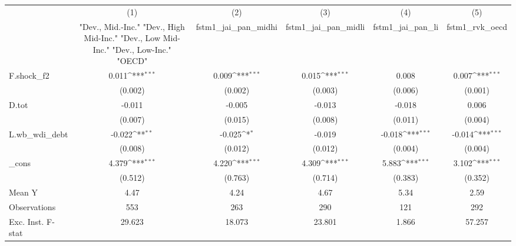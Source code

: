 {
\def\sym#1{\ifmmode^{#1}\else\(^{#1}\)\fi}
\begin{tabular}{l*{5}{c}}
\toprule
            &\multicolumn{1}{c}{(1)}&\multicolumn{1}{c}{(2)}&\multicolumn{1}{c}{(3)}&\multicolumn{1}{c}{(4)}&\multicolumn{1}{c}{(5)}\\
            &\multicolumn{1}{c}{ "Dev., Mid.-Inc." "Dev., High Mid-Inc." "Dev., Low Mid-Inc." "Dev., Low-Inc." "OECD" }&\multicolumn{1}{c}{fstm1\_jai\_pan\_midhi}&\multicolumn{1}{c}{fstm1\_jai\_pan\_midli}&\multicolumn{1}{c}{fstm1\_jai\_pan\_li}&\multicolumn{1}{c}{fstm1\_rvk\_oecd}\\
\midrule
F.shock\_f2  &       0.011\sym{***}&       0.009\sym{***}&       0.015\sym{***}&       0.008         &       0.007\sym{***}\\
            &     (0.002)         &     (0.002)         &     (0.003)         &     (0.006)         &     (0.001)         \\
\addlinespace
D.tot       &      -0.011         &      -0.005         &      -0.013         &      -0.018         &       0.006         \\
            &     (0.007)         &     (0.015)         &     (0.008)         &     (0.011)         &     (0.004)         \\
\addlinespace
L.wb\_wdi\_debt&      -0.022\sym{**} &      -0.025\sym{*}  &      -0.019         &      -0.018\sym{***}&      -0.014\sym{***}\\
            &     (0.008)         &     (0.012)         &     (0.012)         &     (0.004)         &     (0.004)         \\
\addlinespace
\_cons      &       4.379\sym{***}&       4.220\sym{***}&       4.309\sym{***}&       5.883\sym{***}&       3.102\sym{***}\\
            &     (0.512)         &     (0.763)         &     (0.714)         &     (0.383)         &     (0.352)         \\
\midrule
Mean Y      &        4.47         &        4.24         &        4.67         &        5.34         &        2.59         \\
Observations&         553         &         263         &         290         &         121         &         292         \\
Exc. Inst. F-stat&      29.623         &      18.073         &      23.801         &       1.866         &      57.257         \\
\bottomrule
\end{tabular}
}

